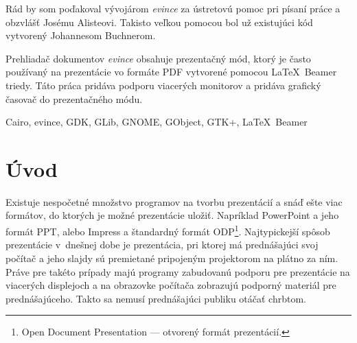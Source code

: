 \documentclass[12pt,oneside,final]{fithesis2}
\begin{document}
\FrontMatter
\ThesisTitlePage




\begin{ThesisDeclaration}
\DeclarationText
\AdvisorName
\end{ThesisDeclaration}

\begin{ThesisThanks}
Rád by som poďakoval vývojárom \emph{evince} za ústretovú pomoc pri písaní práce a obzvlášť Josému Alisteovi. Takisto veľkou pomocou bol už existujúci kód vytvorený Johannesom Buchnerom.
\end{ThesisThanks}  

\begin{ThesisAbstract}
Prehliadač dokumentov \emph{evince} obsahuje prezentačný mód, ktorý je často používaný na prezentácie vo formáte PDF vytvorené pomocou \LaTeX~Beamer triedy. Táto práca pridáva podporu viacerých monitorov a pridáva grafický časovač do prezentačného módu.
\end{ThesisAbstract}

\begin{ThesisKeyWords}
Cairo, evince, GDK, GLib, GNOME, GObject, GTK+, \LaTeX~Beamer
\end{ThesisKeyWords}
 
\MainMatter
\setcounter{tocdepth}{3}
\tableofcontents 
 
\chapter{Úvod}

Existuje nespočetné množstvo programov na tvorbu prezentácií a snáď ešte viac formátov, do ktorých je možné prezentácie uložiť. Napríklad PowerPoint a jeho formát PPT, alebo Impress a štandardný formát ODP\footnote{Open Document Presentation --- otvorený formát prezentácií.}. Najtypickejší spôsob prezentácie v~dnešnej dobe je prezentácia, pri ktorej má prednášajúci svoj počítač a jeho slajdy sú premietané pripojeným projektorom na plátno za ním. Práve pre takéto prípady majú programy zabudovanú podporu pre prezentácie na viacerých displejoch a na obrazovke počítača zobrazujú podporný materiál pre prednášajúceho. Takto sa nemusí prednášajúci publiku otáčať chrbtom.
\end{document}
